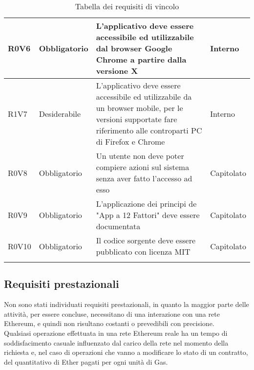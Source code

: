 \documentclass[AnalisiDeiRequisiti.tex]{subfiles}
\begin{document}
\begin{longtable}[H]{|p{2.5cm}|p{2.5cm}|p{5cm}|p{2cm}|}
	R0V6 & Obbligatorio & L'applicativo deve essere accessibile ed utilizzabile dal browser Google Chrome a partire dalla versione X & Interno \\ \hline %
	R1V7 & Desiderabile & L'applicativo deve essere accessibile ed utilizzabile da un browser mobile, per le versioni supportate fare riferimento alle controparti PC di Firefox e Chrome & Interno \\ \hline
	R0V8 & Obbligatorio & Un utente non deve poter compiere azioni sul sistema senza aver fatto l'accesso ad esso & Capitolato \\ \hline
	R0V9 & Obbligatorio & L'applicazione dei principi de "App a 12 Fattori" deve essere documentata & Capitolato \\ \hline
	R0V10 & Obbligatorio & Il codice sorgente deve essere pubblicato con licenza MIT & Capitolato \\ \hline
	\caption{Tabella dei requisiti di vincolo}
\end{longtable}

\subsection{Requisiti prestazionali}

Non sono stati individuati requisiti prestazionali, in quanto la maggior parte delle attività, per essere concluse, necessitano di una interazione con una rete Ethereum, e quindi non risultano costanti o prevedibili con precisione.\\
Qualsiasi operazione effettuata in una rete Ethereum reale ha un tempo di soddisfacimento casuale influenzato dal carico della rete nel momento della richiesta e, nel caso di operazioni che vanno a modificare lo stato di un contratto, del quantitativo di Ether pagati per ogni unità di Gas.\\
 
\begin{comment}
\label{table:Tabella requisiti prestazionali}
\begin{longtable}[H]{|p{2.5cm}|p{2.5cm}|p{5cm}|p{2cm}|}
	\hline
	\rowcolor[HTML]{38FFF8} 
	\textbf{Identificatore} & \textbf{Importanza} & \textbf{Descrizione} & \textbf{Fonti} \\ \hline
	\endhead
	&  &  &  \\ \hline
	&  &  &  \\ \hline
	&  &  &  \\ \hline
	&  &  &  \\ \hline
	&  &  &  \\ \hline
	\caption{Tabella dei requisiti prestazionali}
\end{longtable}
\end{comment}
\end{document}
